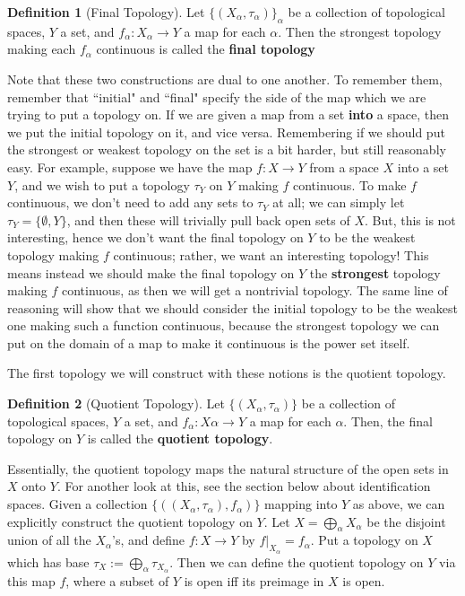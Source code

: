 \documentclass[11pt, oneside]{amsart}   	%
\theoremstyle{definition}
\newtheorem{definition}{Definition}[section]
\begin{document}
	\begin{definition}[Final Topology]
		Let $\{(X_\alpha, \tau_\alpha)\}_\alpha$ be a collection of topological spaces, $Y$ a set, and $f_\alpha : 
		X_\alpha\rightarrow Y$ a map for each $\alpha$. Then the strongest topology making each $f_\alpha$ continuous is 
		called the \textbf{final topology}
	\end{definition}
	
	Note that these two constructions are dual to one another. To remember them, remember that ``initial" and ``final" specify 
	the side of the map which we are trying to put a topology on. If we are given a map from a set \textbf{into} a space, then 
	we put the initial topology on it, and vice versa. Remembering if we should put the strongest or weakest topology on the 
	set is a bit harder, but still reasonably easy. For example, suppose we have the map $f : X\rightarrow Y$ from a space $X$ 
	into a set $Y$, and we wish to put a topology $\tau_Y$ on $Y$ making $f$ continuous. To make $f$ continuous, we don't 
	need to add any sets to $\tau_Y$ at all; we can simply let $\tau_Y = \{\emptyset, Y\}$, and then these will trivially pull back 
	open sets of $X$. But, this is not interesting, hence we don't want the final topology on $Y$ to be the weakest topology 
	making $f$ continuous; rather, we want an interesting topology! This means instead we should make the final topology on 
	$Y$ the \textbf{strongest} topology making $f$ continuous, as then we will get a nontrivial topology. The same line of 
	reasoning will show that we should consider the initial topology to be the weakest one making such a function continuous, 
	because the strongest topology we can put on the domain of a map to make it continuous is the power set itself.
	
	The first topology we will construct with these notions is the quotient topology.
	
	\begin{definition}[Quotient Topology]
		Let $\{(X_\alpha, \tau_\alpha)\}$ be a collection of topological spaces, $Y$ a set, and $f_\alpha : X\alpha\rightarrow 
		Y$ a map for each $\alpha$. Then, the final topology on $Y$ is called the \textbf{quotient topology}. 
	\end{definition}
	
	Essentially, the quotient topology maps the natural structure of the open sets in $X$ onto $Y$. For another look at this, 
	see the section below about identification spaces. Given a collection $\{((X_\alpha, \tau_\alpha), f_\alpha)\}$ mapping into 
	$Y$ as above, we can explicitly construct the quotient topology on $Y$. Let $X = \bigoplus_\alpha X_\alpha$ be the 
	disjoint union of all the $X_\alpha$'s, and define $f : X\rightarrow Y$ by $f|_{X_\alpha} = f_\alpha$. Put a topology on $X$ 
	which has base $\tau_X := \bigoplus_\alpha \tau_{X_\alpha}$. Then we can define the quotient topology on $Y$ via this 
	map $f$, where a subset of $Y$ is open iff its preimage in $X$ is open. 
	
\end{document}
